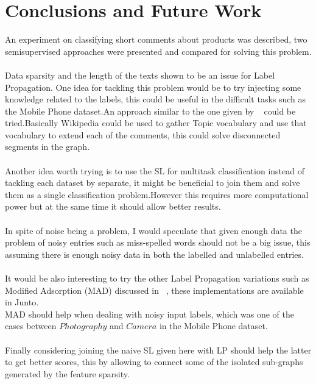\documentclass[4pt,a4paper,twocolumn]{article}
\begin{document}
\section{Conclusions and Future Work}
An experiment on classifying short comments about products was described, two semisupervised approaches were presented and compared for solving this problem.\\
\\
Data sparsity and the length of the texts shown to be an issue for Label Propagation.
One idea for tackling this problem would be to try injecting some knowledge related to the labels, this could be useful in the difficult tasks such as the Mobile Phone dataset.An approach similar to the one given by ~\cite{Gabrilovich:2006:OBB:1597348.1597395} could be tried.Basically Wikipedia could be used to gather Topic vocabulary and use that vocabulary to extend each of the comments, this could solve disconnected segments in the graph.\\
\\
Another idea worth trying is to use the SL for multitask classification instead of tackling each dataset by separate, it might be beneficial  to  join them and solve them as a single classification problem.However this requires more computational power but  at the same time it should allow better results.\\
\\
In spite of noise being a problem, I would speculate that given enough data the problem of noisy entries such as miss-spelled words should not be a big issue, this assuming there is enough noisy data in both the labelled and unlabelled entries.\\
\\
It would be also interesting to try the other Label Propagation variations such as Modified Adsorption (MAD) discussed in ~\cite{Talukdar:2010:EGS:1858681.1858830}, these implementations are available in Junto.\\
MAD should help when dealing with noisy input labels, which was one of the cases between $Photography$ and $Camera$ in the Mobile Phone dataset.\\
\\
Finally considering joining the naive SL given here with LP should help the latter to get better scores, this by allowing to connect some of the isolated sub-graphs generated by the feature sparsity.


\end{document}
